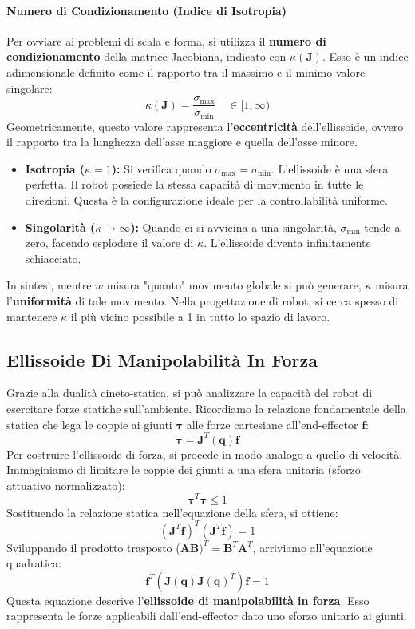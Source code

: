 \documentclass[11pt, a4paper]{report}
\begin{document}
\paragraph{Numero di Condizionamento (Indice di Isotropia)}
Per ovviare ai problemi di scala e forma, si utilizza il \textbf{numero di condizionamento} della matrice Jacobiana, indicato con $\kappa(\bm{J})$. Esso è un indice adimensionale definito come il rapporto tra il massimo e il minimo valore singolare:
\[
    \kappa(\bm{J}) = \frac{\sigma_{\text{max}}}{\sigma_{\text{min}}} \quad \in [1, \infty)
\]
Geometricamente, questo valore rappresenta l'\textbf{eccentricità} dell'ellissoide, ovvero il rapporto tra la lunghezza dell'asse maggiore e quella dell'asse minore.
\begin{itemize}
    \item \textbf{Isotropia ($\kappa = 1$):} Si verifica quando $\sigma_{\text{max}} = \sigma_{\text{min}}$. L'ellissoide è una sfera perfetta. Il robot possiede la stessa capacità di movimento in tutte le direzioni. Questa è la configurazione ideale per la controllabilità uniforme.
    \item \textbf{Singolarità ($\kappa \to \infty$):} Quando ci si avvicina a una singolarità, $\sigma_{\text{min}}$ tende a zero, facendo esplodere il valore di $\kappa$. L'ellissoide diventa infinitamente schiacciato.
\end{itemize}
In sintesi, mentre $w$ misura "quanto" movimento globale si può generare, $\kappa$ misura l'\textbf{uniformità} di tale movimento. Nella progettazione di robot, si cerca spesso di mantenere $\kappa$ il più vicino possibile a 1 in tutto lo spazio di lavoro.
\newpage
\subsection{Ellissoide Di Manipolabilità In Forza}
Grazie alla dualità cineto-statica, si può analizzare la capacità del robot di esercitare forze statiche sull'ambiente. Ricordiamo la relazione fondamentale della statica che lega le coppie ai giunti $\bm{\tau}$ alle forze cartesiane all'end-effector $\bm{f}$:
\[
    \bm{\tau} = \bm{J}^T(\bm{q}) \bm{f}
\]
Per costruire l'ellissoide di forza, si procede in modo analogo a quello di velocità. Immaginiamo di limitare le coppie dei giunti a una sfera unitaria (sforzo attuativo normalizzato):
\[
    \bm{\tau}^T\bm{\tau} \leq 1
\]
Sostituendo la relazione statica nell'equazione della sfera, si ottiene:
\[
    (\bm{J}^T\bm{f})^T (\bm{J}^T\bm{f}) = 1
\]
Sviluppando il prodotto trasposto ($\bm{A}\bm{B})^T = \bm{B}^T\bm{A}^T$, arriviamo all'equazione quadratica:
\begin{equation}
    \bm{f}^T \left( \bm{J}(\bm{q})\bm{J}(\bm{q})^T \right) \bm{f} = 1
\end{equation}
Questa equazione descrive l'\textbf{ellissoide di manipolabilità in forza}. Esso rappresenta le forze applicabili dall'end-effector dato uno sforzo unitario ai giunti.
\end{document}
